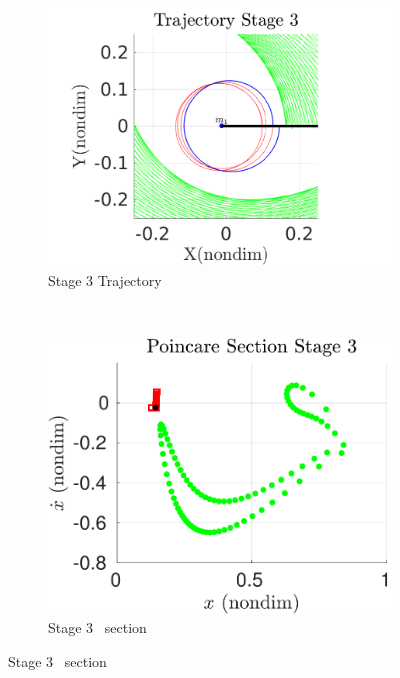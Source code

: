 \begin{figure}[htbp]
    \begin{subfigure}[htbp]{0.5\textwidth} 
        \includegraphics[width=\textwidth, keepaspectratio]{figures/2017_JAS/stage3_trajectory_zoom.pdf} 
        \caption{Stage 3 Trajectory~\label{fig:stage3_trajecotry_zoom}} 
    \end{subfigure}~
    \begin{subfigure}[htbp]{0.5\textwidth} 
        \includegraphics[width=\textwidth, keepaspectratio]{figures/2017_JAS/stage3_poincare.pdf} 
        \caption{Stage 3 \Poincare~section \label{fig:stage3_poincare}} 
    \end{subfigure}
 

\end{figure}

